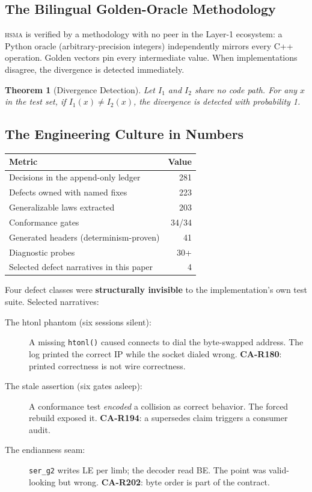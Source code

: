 \documentclass[11pt, a4paper]{article}
\newtheorem{theorem}{Theorem}
\newcommand{\hsma}{\textsc{hsma}}
\begin{document}
\subsection{The Bilingual Golden-Oracle Methodology}

\hsma{} is verified by a methodology with no peer in the Layer-1
ecosystem: a Python oracle (arbitrary-precision integers) independently
mirrors every C++ operation. Golden vectors pin every intermediate
value. When implementations disagree, the divergence is detected
immediately.

\begin{theorem}[Divergence Detection]
Let $I_1$ and $I_2$ share no code path. For any $x$ in the test set,
if $I_1(x) \neq I_2(x)$, the divergence is detected with probability 1.
\end{theorem}

\subsection{The Engineering Culture in Numbers}

\begin{table}[h]
\centering
{}
\begin{tabular}{lr}
\rowcolor{hsmaGold!20} \textbf{Metric} & \textbf{Value} \\
\midrule
Decisions in the append-only ledger & 281 \\
Defects owned with named fixes & 223 \\
Generalizable laws extracted & 203 \\
Conformance gates & 34/34 \\
Generated headers (determinism-proven) & 41 \\
Diagnostic probes & 30+ \\
Selected defect narratives in this paper & 4 \\
\bottomrule
\end{tabular}
\end{table}

Four defect classes were \textbf{structurally invisible} to the
implementation's own test suite. Selected narratives:

\begin{description}
\item[The htonl phantom (six sessions silent):] A missing
\texttt{htonl()} caused connects to dial the byte-swapped address.
The log printed the correct IP while the socket dialed wrong.
\textbf{CA-R180}: printed correctness is not wire correctness.

\item[The stale assertion (six gates asleep):] A conformance test
\emph{encoded} a collision as correct behavior. The forced rebuild
exposed it. \textbf{CA-R194}: a supersedes claim triggers a consumer audit.

\item[The endianness seam:] \texttt{ser\_g2} writes LE per limb; the
decoder read BE. The point was valid-looking but wrong.
\textbf{CA-R202}: byte order is part of the contract.
\end{description}
\end{document}
